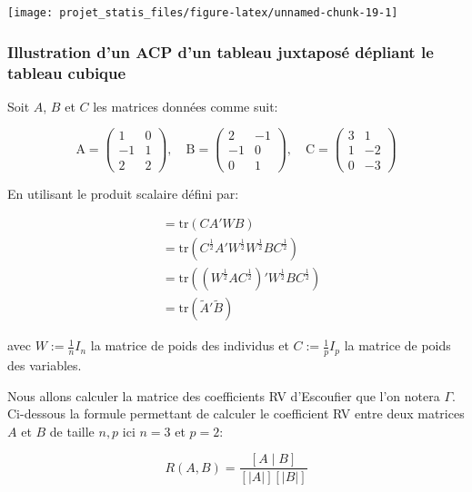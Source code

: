 \documentclass[
]{article}
\begin{document}
\begin{center}\texttt{[image: projet\_statis\_files/figure-latex/unnamed-chunk-19-1]} \end{center}

\hypertarget{illustration-dun-acp-dun-tableau-juxtaposuxe9-duxe9pliant-le-tableau-cubique}{%
\subsubsection{Illustration d'un ACP d'un tableau juxtaposé dépliant le
tableau
cubique}\label{illustration-dun-acp-dun-tableau-juxtaposuxe9-duxe9pliant-le-tableau-cubique}}

Soit \(A\), \(B\) et \(C\) les matrices données comme suit:

\[
\text{A} = \begin{pmatrix}
1 & 0  \\
-1 & 1 \\
2 & 2 
\end{pmatrix}, \quad
\text{B} = \begin{pmatrix}
2 & -1  \\
-1 & 0 \\
0 & 1 
\end{pmatrix}, \quad
\text{C} = \begin{pmatrix}
3 & 1  \\
1 & -2 \\
0 & -3 
\end{pmatrix}
\]

En utilisant le produit scalaire défini par:

\begin{align*}
[A \mid B] &= \text{tr}(CA'WB) \\
&= \text{tr}(C^{\frac{1}{2}} A'W^{\frac{1}{2}} W^{\frac{1}{2}} B C^{\frac{1}{2}}) \\
&= \text{tr}((W^{\frac{1}{2}} A C^{\frac{1}{2}})' W^{\frac{1}{2}} B C^{\frac{1}{2}}) \\
&= \text{tr}(\tilde{A}'\tilde{B})
\end{align*}

avec \(W:= \frac{1}{n}I_n\) la matrice de poids des individus et
\(C:= \frac{1}{p}I_p\) la matrice de poids des variables.

Nous allons calculer la matrice des coefficients RV d'Escoufier que l'on
notera \(\Gamma\). Ci-dessous la formule permettant de calculer le
coefficient RV entre deux matrices \(A\) et \(B\) de taille \(n,p\) ici
\(n=3\) et \(p=2\):

\[ R(A ,B) = \frac{[ A \mid B]}{\left[\left| A \right|\right] \left[\left| B \right|\right] } \]
\end{document}
